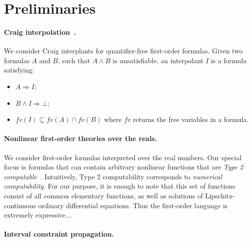 \section{Preliminaries}
\label{sec:prelim}

\paragraph{Craig interpolation~\cite{MR0104564}.}
We consider Craig interplants for quantifier-free first-order formulas. Given two formulas $A$ and $B$, such that $A ∧ B$ is unsatisfiable, an interpolant $I$ is a formula satisfying:
\begin{itemize}
\item $A ⇒ I$;
\item $B ∧ I ⇒ ⊥$;
\item $fv(I) ⊆ fv(A) ∩ fv(B)$ where $fv$ returns the free variables in a formula.
\end{itemize}

\paragraph{Nonlinear first-order theories over the reals.} 

We consider first-order formulas interpreted over the real numbers. Our special focus is formulas that can contain arbitrary nonlinear functions that are {\em Type 2 computable}~\cite{CAbook,vasco}. Intuitively, Type 2 computability corresponds to {\em numerical computability}. For our purpose, it is enough to note that this set of functions consist of all common elementary functions, as well as solutions of Lipschitz-continuous ordinary differential equations. Thus the first-order language is extremely expressive... 

\paragraph{Interval constraint propagation.}

